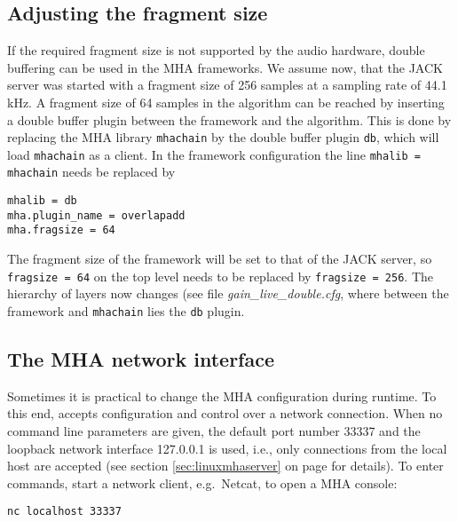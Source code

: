 \subsection{Adjusting the fragment size}%
%
%

If the required fragment size is not supported by the audio hardware,
double buffering can be used in the MHA frameworks. We assume now,
that the JACK server was started with a fragment size of 256 samples at
a sampling rate of 44.1 kHz. A fragment size of 64 samples in the algorithm 
can be reached by inserting a double buffer plugin between the framework and the algorithm. This is
done by replacing the MHA library \verb!mhachain! by the double
buffer plugin \verb!db!, which will load \verb!mhachain! as a
client. In the framework configuration the line \verb!mhalib = mhachain! needs
be replaced by
\begin{verbatim}
mhalib = db
mha.plugin_name = overlapadd
mha.fragsize = 64
\end{verbatim}
The fragment size of the framework will be set to that of the JACK
server, so \verb!fragsize = 64! on the top level needs to be replaced by
\verb!fragsize = 256!. The hierarchy of layers now changes (see 
file \emph{gain\_live\_double.cfg}, where between the framework
and \verb!mhachain! lies the \verb!db! plugin.


\subsection{The MHA network interface}%
\label{sec:example_network}%
%
%
Sometimes it is practical to change the MHA configuration during runtime. To
this end, \mha{} accepts configuration and control over a network connection.
%
When no command line parameters are given, the default port number
33337 and the loopback network interface 127.0.0.1 is used, i.e., only
connections from the local host are accepted (see section
\ref{sec:linuxmhaserver} on page \pageref{sec:linuxmhaserver} for
details).
%
To enter \mha{} commands, start a network client, e.g.\ Netcat, to
open a MHA console:
\begin{verbatim}nc localhost 33337\end{verbatim}

